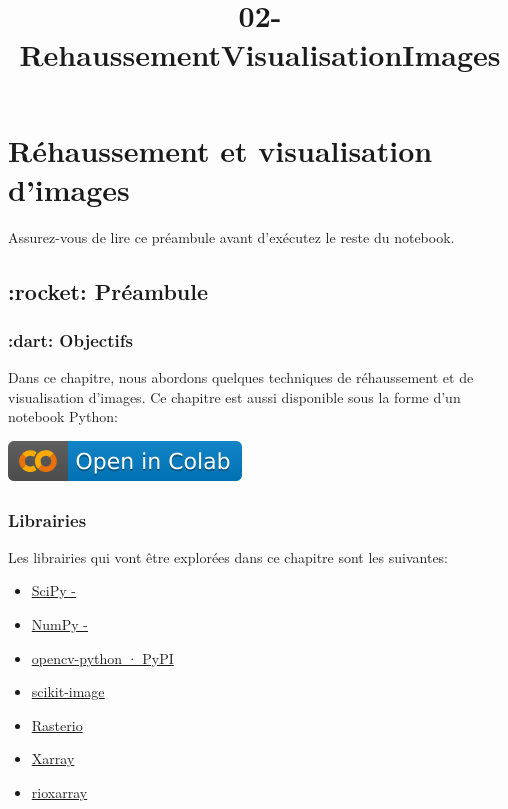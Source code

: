 \documentclass[11pt]{article}
\title{02-RehaussementVisualisationImages}
\begin{document}
    
    \maketitle
    
    

    
    \hypertarget{sec-chap02}{%
\section{Réhaussement et visualisation d'images}\label{sec-chap02}}

Assurez-vous de lire ce préambule avant d'exécutez le reste du notebook.

\hypertarget{rocket-pruxe9ambule}{%
\subsection{:rocket: Préambule}\label{rocket-pruxe9ambule}}

\hypertarget{dart-objectifs}{%
\subsubsection{:dart: Objectifs}\label{dart-objectifs}}

Dans ce chapitre, nous abordons quelques techniques de réhaussement et
de visualisation d'images. Ce chapitre est aussi disponible sous la
forme d'un notebook Python:

\href{https://colab.research.google.com/github/sfoucher/TraitementImagesPythonVol1/blob/main/notebooks/02-RehaussementVisualisationImages.ipynb}{\includegraphics{images/colab-badge.svg}}

\hypertarget{librairies}{%
\subsubsection{Librairies}\label{librairies}}

Les librairies qui vont être explorées dans ce chapitre sont les
suivantes:

\begin{itemize}
\item
  \href{https://scipy.org/}{SciPy -}
\item
  \href{https://numpy.org/}{NumPy -}
\item
  \href{https://pypi.org/project/opencv-python/}{opencv-python · PyPI}
\item
  \href{https://scikit-image.org/}{scikit-image}
\item
  \href{https://rasterio.readthedocs.io/en/stable/}{Rasterio}
\item
  \href{https://docs.xarray.dev/en/stable/}{Xarray}
\item
  \href{https://corteva.github.io/rioxarray/stable/index.html}{rioxarray}
\end{itemize}
\end{document}
